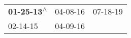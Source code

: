 \begin{supertabular}{lll}
 \textbf{01-25-13\textsuperscript{$\wedge$}} &  04-08-16\textsuperscript{} &  07-18-19\textsuperscript{} \\
                  02-14-15\textsuperscript{} &  04-09-16\textsuperscript{} &                             \\
\end{supertabular}
